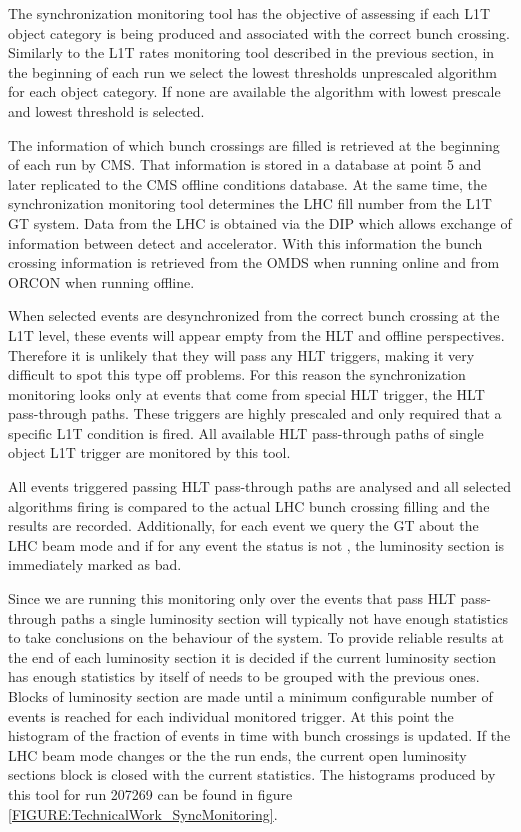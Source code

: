 
The synchronization monitoring tool has the objective of assessing if each \gls{L1T} object category is being produced and associated with the correct bunch crossing. Similarly to the \gls{L1T} rates monitoring tool described in the previous section, in the beginning of each run we select the lowest thresholds unprescaled algorithm for each object category. If none are available the algorithm with lowest prescale and lowest threshold is selected.

The information of which bunch crossings are filled is retrieved at the beginning of each run by \gls{CMS}. That information is stored in a database at point 5 and later replicated to the \gls{CMS} offline conditions database. At the same time, the synchronization monitoring tool determines the \gls{LHC} fill number from the \gls{L1T} \gls{GT} system. Data from the \gls{LHC} is obtained via the \gls{DIP} which allows exchange of information between detect and accelerator. With this information the bunch crossing information is retrieved from the \gls{OMDS} when running online and from \gls{ORCON} when running offline.

When selected events are desynchronized from the correct bunch crossing at the \gls{L1T} level, these events will appear empty from the \gls{HLT} and offline perspectives. Therefore it is unlikely that they will pass any \gls{HLT} triggers, making it very difficult to spot this type off problems. For this reason the synchronization monitoring looks only at events that come from special \gls{HLT} trigger, the \gls{HLT} pass-through paths. These triggers are highly prescaled and only required that a specific \gls{L1T} condition is fired. All available \gls{HLT} pass-through paths of single object \gls{L1T} trigger are monitored by this tool.

All events triggered passing \gls{HLT} pass-through paths are analysed and all selected algorithms firing is compared to the actual \gls{LHC} bunch crossing filling and the results are recorded. Additionally, for each event we query the \gls{GT} about the \gls{LHC} beam mode and if for any event the status is not , the luminosity section is immediately marked as bad.

Since we are running this monitoring only over the events that pass \gls{HLT} pass-through paths a single luminosity section will typically not have enough statistics to take conclusions on the behaviour of the system. To provide reliable results at the end of each luminosity section it is decided if the current luminosity section has enough statistics by itself of needs to be grouped with the previous ones. Blocks of luminosity section are made until a minimum configurable number of events is reached for each individual monitored trigger. At this point the histogram of the fraction of events in time with bunch crossings is updated. If the \gls{LHC} beam mode changes or the the run ends, the current open luminosity sections block is closed with the current statistics. The histograms produced by this tool for run 207269 can be found in figure \ref{FIGURE:TechnicalWork_SyncMonitoring}.

